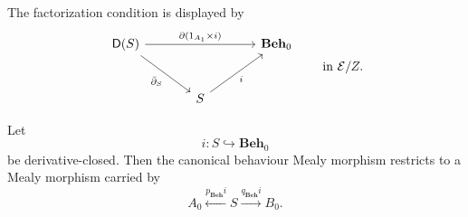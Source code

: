The factorization condition is displayed by
\[
    \begin{tikzcd}[column sep=large, row sep=large]
            \mathsf D(S)
                \arrow[rr, "{\partial(1_{A_1}\times i)}"]
                \arrow[dr, "\bar\partial_S"']
        &
        &
            \mathbf{Beh}_0
        \\
        &
            S
                \arrow[ur, "i"']
        &
    \end{tikzcd}
    \qquad
    \text{in }\mathcal E/Z.
\]

\begin{lemma}
\label{lem:restriction-derivative-closed-subobject}
    Let
    \[
        i:S\hookrightarrow\mathbf{Beh}_0
    \]
    be derivative-closed. Then the canonical behaviour Mealy morphism
    restricts to a Mealy morphism carried by
    \[
        A_0\xleftarrow{p_{\mathbf{Beh}}i}S
        \xrightarrow{q_{\mathbf{Beh}}i}B_0.
    \]
\end{lemma}
